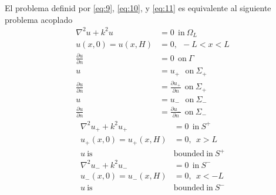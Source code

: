 \documentclass[11pt]{article}
\begin{document}
El problema definid por \eqref{eq:9}, \eqref{eq:10}, y \eqref{eq:11} es equivalente al siguiente problema acoplado
\begin{subequations}
  \label{eq:omegaL}
\begin{align}
  \nabla^2 u + k^2u &= 0~~\mathrm{in}~\Omega_L \\
  u(x,0)=u(x,H)&=0,~~-L < x < L \\
  \frac{\partial u}{\partial n} &= 0~~\mathrm{on}~ \Gamma \\
  u &= u_{+}~~~\mathrm{on}~ \Sigma_{+} \label{eq:cp1} \\
  \frac{\partial u}{\partial n} &= \frac{\partial u_{+}}{\partial n}~~\mathrm{on}~\Sigma_{+}  \label{eq:cp2}\\
    u &= u_{-}~~~\mathrm{on}~ \Sigma_{-} \\
  \frac{\partial u}{\partial n} &= \frac{\partial u_{-}}{\partial n}~~\mathrm{on}~\Sigma_{-}
\end{align}
\end{subequations}
\begin{subequations}
  \label{eq:Sp}
\begin{align}
  \nabla^2 u_+ + k^2u_+ &= 0~~\mathrm{in}~S^+ \\
  u_+(x,0)=u_+(x,H) &=0,~~x > L \\
  u~\mathrm{is}~&\mathrm{bounded}~\mathrm{in}~S^+
\end{align}  
\end{subequations}
\begin{subequations}
  \label{eq:Sm}
\begin{align}
  \nabla^2 u_- + k^2u_- &= 0~~\mathrm{in}~S^- \\
  u_-(x,0)=u_-(x,H) &=0,~~x < -L \\
  u~\mathrm{is}~&\mathrm{bounded}~\mathrm{in}~S^-
\end{align}  
\end{subequations}
\end{document}
